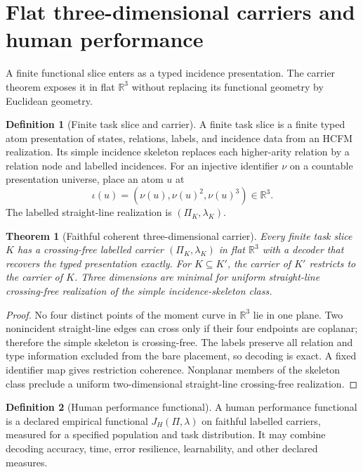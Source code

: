 \documentclass[11pt]{article}
\newtheorem{theorem}{Theorem}
\theoremstyle{definition}
\newtheorem{definition}{Definition}
\begin{document}
\section{Flat three-dimensional carriers and human performance}

A finite functional slice enters as a typed incidence presentation. The carrier theorem exposes it in flat $\mathbb{R}^3$ without replacing its functional geometry by Euclidean geometry.

\begin{definition}[Finite task slice and carrier]
A finite task slice is a finite typed atom presentation of states, relations, labels, and incidence data from an HCFM realization. Its simple incidence skeleton replaces each higher-arity relation by a relation node and labelled incidences. For an injective identifier $\nu$ on a countable presentation universe, place an atom $u$ at
\begin{equation}
\iota(u) = (\nu(u), \nu(u)^2, \nu(u)^3) \in \mathbb{R}^3. \tag{S13}
\end{equation}
The labelled straight-line realization is $(\Pi_K, \lambda_K)$.
\end{definition}

\begin{theorem}[Faithful coherent three-dimensional carrier]
\label{thm:faithful-3d-carrier}
Every finite task slice $K$ has a crossing-free labelled carrier $(\Pi_K, \lambda_K)$ in flat $\mathbb{R}^3$ with a decoder that recovers the typed presentation exactly. For $K \subseteq K'$, the carrier of $K'$ restricts to the carrier of $K$. Three dimensions are minimal for uniform straight-line crossing-free realization of the simple incidence-skeleton class.
\end{theorem}

\begin{proof}
No four distinct points of the moment curve in $\mathbb{R}^3$ lie in one plane. Two nonincident straight-line edges can cross only if their four endpoints are coplanar; therefore the simple skeleton is crossing-free. The labels preserve all relation and type information excluded from the bare placement, so decoding is exact. A fixed identifier map gives restriction coherence. Nonplanar members of the skeleton class preclude a uniform two-dimensional straight-line crossing-free realization.
\end{proof}

\begin{definition}[Human performance functional]
A human performance functional is a declared empirical functional $J_H(\Pi, \lambda)$ on faithful labelled carriers, measured for a specified population and task distribution. It may combine decoding accuracy, time, error resilience, learnability, and other declared measures.
\end{definition}
\end{document}
